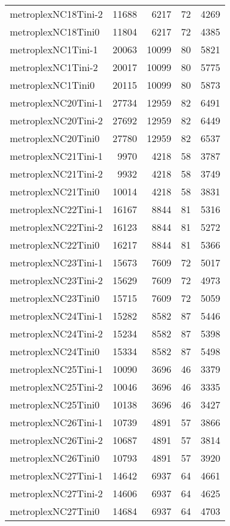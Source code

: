 \begin{longtable}{lrrrr}
metroplexNC18Tini-2 & 11688 & 6217 & 72 & 4269 \\
metroplexNC18Tini0 & 11804 & 6217 & 72 & 4385 \\
metroplexNC1Tini-1 & 20063 & 10099 & 80 & 5821 \\
metroplexNC1Tini-2 & 20017 & 10099 & 80 & 5775 \\
metroplexNC1Tini0 & 20115 & 10099 & 80 & 5873 \\
metroplexNC20Tini-1 & 27734 & 12959 & 82 & 6491 \\
metroplexNC20Tini-2 & 27692 & 12959 & 82 & 6449 \\
metroplexNC20Tini0 & 27780 & 12959 & 82 & 6537 \\
metroplexNC21Tini-1 & 9970 & 4218 & 58 & 3787 \\
metroplexNC21Tini-2 & 9932 & 4218 & 58 & 3749 \\
metroplexNC21Tini0 & 10014 & 4218 & 58 & 3831 \\
metroplexNC22Tini-1 & 16167 & 8844 & 81 & 5316 \\
metroplexNC22Tini-2 & 16123 & 8844 & 81 & 5272 \\
metroplexNC22Tini0 & 16217 & 8844 & 81 & 5366 \\
metroplexNC23Tini-1 & 15673 & 7609 & 72 & 5017 \\
metroplexNC23Tini-2 & 15629 & 7609 & 72 & 4973 \\
metroplexNC23Tini0 & 15715 & 7609 & 72 & 5059 \\
metroplexNC24Tini-1 & 15282 & 8582 & 87 & 5446 \\
metroplexNC24Tini-2 & 15234 & 8582 & 87 & 5398 \\
metroplexNC24Tini0 & 15334 & 8582 & 87 & 5498 \\
metroplexNC25Tini-1 & 10090 & 3696 & 46 & 3379 \\
metroplexNC25Tini-2 & 10046 & 3696 & 46 & 3335 \\
metroplexNC25Tini0 & 10138 & 3696 & 46 & 3427 \\
metroplexNC26Tini-1 & 10739 & 4891 & 57 & 3866 \\
metroplexNC26Tini-2 & 10687 & 4891 & 57 & 3814 \\
metroplexNC26Tini0 & 10793 & 4891 & 57 & 3920 \\
metroplexNC27Tini-1 & 14642 & 6937 & 64 & 4661 \\
metroplexNC27Tini-2 & 14606 & 6937 & 64 & 4625 \\
metroplexNC27Tini0 & 14684 & 6937 & 64 & 4703 \\

\end{longtable}
